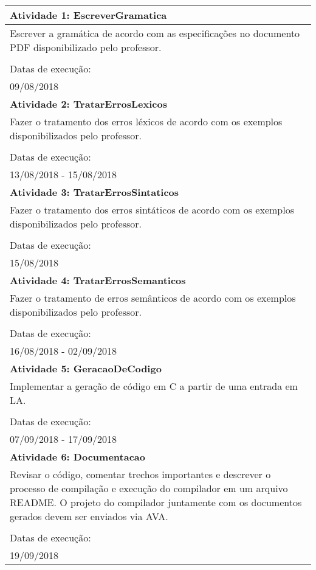\documentclass[a4paper,10pt]{article}
\newcommand{\myrowcolour}{\rowcolor[gray]{0.925}}
\begin{document}
\begin{longtable}{p{}}
\toprule
\myrowcolour
\bfseries Atividade 1: EscreverGramatica \\
\midrule
Escrever a gramática de acordo com as especificações
            no documento PDF disponibilizado pelo professor.
\\
\\
Datas de execu\c{c}\~{a}o:\\
09/08/2018\\
\midrule
\myrowcolour
\bfseries Atividade 2: TratarErrosLexicos \\
\midrule
Fazer o tratamento dos erros léxicos de acordo com os
            exemplos disponibilizados pelo professor.
\\
\\
Datas de execu\c{c}\~{a}o:\\
13/08/2018 - 15/08/2018\\
\midrule
\myrowcolour
\bfseries Atividade 3: TratarErrosSintaticos \\
\midrule
Fazer o tratamento dos erros sintáticos de acordo com os
            exemplos disponibilizados pelo professor.
\\
\\
Datas de execu\c{c}\~{a}o:\\
15/08/2018\\
\midrule
\myrowcolour
\bfseries Atividade 4: TratarErrosSemanticos \\
\midrule
Fazer o tratamento de erros semânticos de acordo com os
            exemplos disponibilizados pelo professor.
\\
\\
Datas de execu\c{c}\~{a}o:\\
16/08/2018 - 02/09/2018\\
\midrule
\myrowcolour
\bfseries Atividade 5: GeracaoDeCodigo \\
\midrule
Implementar a geração de código em C a partir de uma entrada
            em LA.
\\
\\
Datas de execu\c{c}\~{a}o:\\
07/09/2018 - 17/09/2018\\
\midrule
\myrowcolour
\bfseries Atividade 6: Documentacao \\
\midrule
Revisar o código, comentar trechos importantes e descrever o
            processo de compilação e execução do compilador em um arquivo README.
            O projeto do compilador juntamente com os documentos gerados devem ser
            enviados via AVA.
\\
\\
Datas de execu\c{c}\~{a}o:\\
19/09/2018\\
\bottomrule
\end{longtable}
\end{document}
